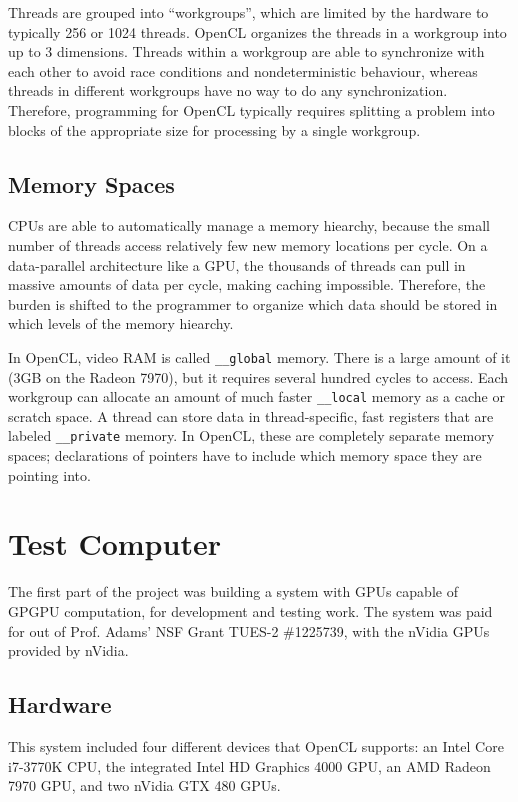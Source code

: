 \documentclass{article}
\begin{document}
Threads are grouped into ``workgroups'', which are limited by the hardware to typically 256 or 1024 threads. OpenCL organizes the threads in a workgroup into up to 3 dimensions. Threads within a workgroup are able to synchronize with each other to avoid race conditions and nondeterministic behaviour, whereas threads in different workgroups have no way to do any synchronization. Therefore, programming for OpenCL typically requires splitting a problem into blocks of the appropriate size for processing by a single workgroup.

\subsection{Memory Spaces}
CPUs are able to automatically manage a memory hiearchy, because the small number of threads access relatively few new memory locations per cycle. On a data-parallel architecture like a GPU, the thousands of threads can pull in massive amounts of data per cycle, making caching impossible. Therefore, the burden is shifted to the programmer to organize which data should be stored in which levels of the memory hiearchy.

In OpenCL, video RAM is called \texttt{\_\_global} memory. There is a large amount of it (3GB on the Radeon 7970), but it requires several hundred cycles to access. Each workgroup can allocate an amount of much faster \texttt{\_\_local} memory as a cache or scratch space. A thread can store data in thread-specific, fast registers that are labeled \texttt{\_\_private} memory. In OpenCL, these are completely separate memory spaces; declarations of pointers have to include which memory space they are pointing into.

\section{Test Computer}
The first part of the project was building a system with GPUs capable of GPGPU computation, for development and testing work. The system was paid for out of Prof. Adams' NSF Grant TUES-2 \#1225739, with the nVidia GPUs provided by nVidia.

\subsection{Hardware}
This system included four different devices that OpenCL supports: an Intel Core i7-3770K CPU, the integrated Intel HD Graphics 4000 GPU, an AMD Radeon 7970 GPU, and two nVidia GTX 480 GPUs.
\end{document}
